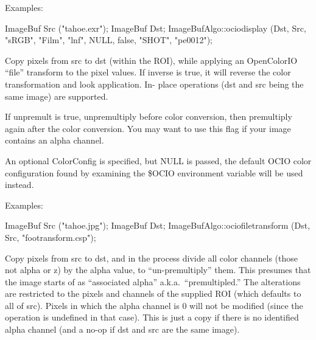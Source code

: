 \smallskip
\noindent Examples:
\begin{code}
    ImageBuf Src ("tahoe.exr");
    ImageBuf Dst;
    ImageBufAlgo::ociodisplay (Dst, Src, "sRGB", "Film", "lnf", NULL,
                               false, "SHOT", "pe0012");
\end{code}
\apiend


 
Copy pixels from {\cf src} to {\cf dst} (within the ROI), while applying an
OpenColorIO ``file'' transform to the pixel values. If {\cf inverse} is {\cf
true}, it will reverse the color transformation and look application. In-
place operations ({\cf dst} and {\cf src} being the same image) are
supported.

If {\cf unpremult} is {\cf true}, unpremultiply before color conversion,
then premultiply again after the color conversion.  You may want to use
this flag if your image contains an alpha channel.

An optional {\cf ColorConfig} is specified, but {\cf NULL} is passed, the
default OCIO color configuration found by examining the {\cf \$OCIO}
environment variable will be used instead.

\smallskip
\noindent Examples:
\begin{code}
    ImageBuf Src ("tahoe.jpg");
    ImageBuf Dst;
    ImageBufAlgo::ociofiletransform (Dst, Src, "footransform.csp");
\end{code}
\apiend


 
Copy pixels from {\cf src} to {\cf dst}, and in the process 
divide all color channels (those not alpha or z) 
by the alpha value, to ``un-premultiply'' them.  This presumes that the
image starts of as ``associated alpha'' a.k.a.\ ``premultipled.''  The
alterations are restricted to the pixels and channels of the supplied
ROI (which defaults to all of {\cf src}).  Pixels in which the alpha
channel is 0 will not be modified (since the operation is undefined in
that case).  This is just a copy if there is no identified alpha channel
(and a no-op if {\cf dst} and {\cf src} are the same image).

